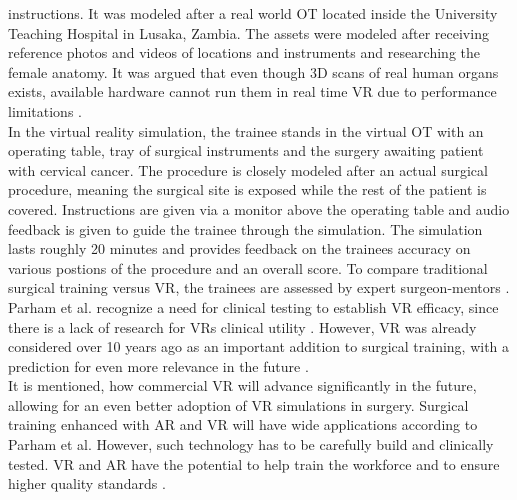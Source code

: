 instructions. It was modeled after a real world OT located inside the University Teaching
Hospital in Lusaka, Zambia. The assets were modeled after receiving reference photos
and videos of locations and instruments and researching the female anatomy. It was
argued that even though 3D scans of real human organs exists, available hardware cannot
run them in real time VR due to performance limitations \cite{Parham.2019}.
\\ In the virtual reality simulation, the trainee stands in the virtual OT with an operating
table, tray of surgical instruments and the surgery awaiting patient with cervical cancer.
The procedure is closely modeled after an actual surgical procedure, meaning the surgical
site is exposed while the rest of the patient is covered. Instructions are given via a
monitor above the operating table and audio feedback is given to guide the trainee
through the simulation. The simulation lasts roughly 20 minutes and provides feedback
on the trainees accuracy on various postions of the procedure and an overall score. To
compare traditional surgical training versus VR, the trainees are assessed by expert
surgeon-mentors \cite{Parham.2019}.
\\ Parham et al. recognize a need for clinical testing to establish VR efficacy, since there is
a lack of research for VRs clinical utility \cite{RN59}. However, VR was already considered over
10 years ago as an important addition to surgical training, with a prediction for even
more relevance in the future \cite{RN60}.
\\ It is mentioned, how commercial VR will advance significantly in the future, allowing
for an even better adoption of VR simulations in surgery. Surgical training enhanced
with AR and VR will have wide applications according to Parham et
al. However, such technology has to be carefully build and clinically tested. VR and
AR have the potential to help train the workforce and to ensure higher quality standards
\cite{Parham.2019}.

